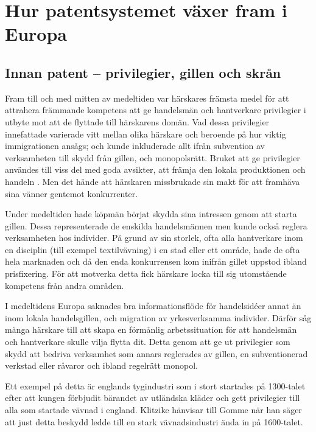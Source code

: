 \section{Hur patentsystemet växer fram i Europa}
\label{sec:med}

\subsection{Innan patent -- privilegier, gillen och skrån} %
\label{sub:innan_patent_systemet}

Fram till och med mitten av medeltiden var härskares främsta medel för att
attrahera främmande kompetens att ge handelsmän och hantverkare privilegier i
utbyte mot att de flyttade till härskarens domän. 
Vad dessa privilegier innefattade varierade vitt mellan olika härskare och
beroende på hur viktig immigrationen ansågs; och kunde inkluderade allt ifrån
subvention av verksamheten till skydd från gillen, och monopolsrätt. 
Bruket att ge privilegier användes till viss del med goda avsikter, att främja
den lokala produktionen och handeln \cite{nard}. Men det hände att härskaren
missbrukade sin makt för att framhäva sina vänner gentemot konkurrenter.

Under medeltiden hade köpmän börjat skydda sina intressen genom att starta
gillen. 
Dessa representerade de enskilda handelsmännen men kunde också reglera
verksamheten hos individer.
På grund av sin storlek, ofta alla hantverkare inom en disciplin (till exempel
textilvävning) i en stad eller ett område, hade de ofta hela marknaden och då
den enda konkurrensen kom inifrån gillet uppstod ibland prisfixering. 
För att motverka detta fick härskare locka till sig utomstående kompetens från
andra områden.

I medeltidens Europa saknades bra informationsflöde för handelsidéer annat än
inom lokala handelsgillen, och migration av yrkesverksamma individer. 
Därför såg många härskare till att skapa en förmånlig arbetssituation för att
handelsmän och hantverkare skulle vilja flytta dit. 
Detta genom att ge ut privilegier som skydd att bedriva verksamhet som annars
reglerades av gillen, en subventionerad verkstad eller råvaror och ibland
regelrätt monopol.

Ett exempel på detta är englands tygindustri som i stort startades på 1300-talet efter att kungen förbjudit bärandet av utländska kläder och gett privilegier till alla som startade vävnad i england\cite{klitzike}. Klitzike\cite{klitzike} hänvisar till Gomme\cite{gomme} när han säger att just detta beskydd ledde till en stark vävnadsindustri ända in på 1600-talet.


